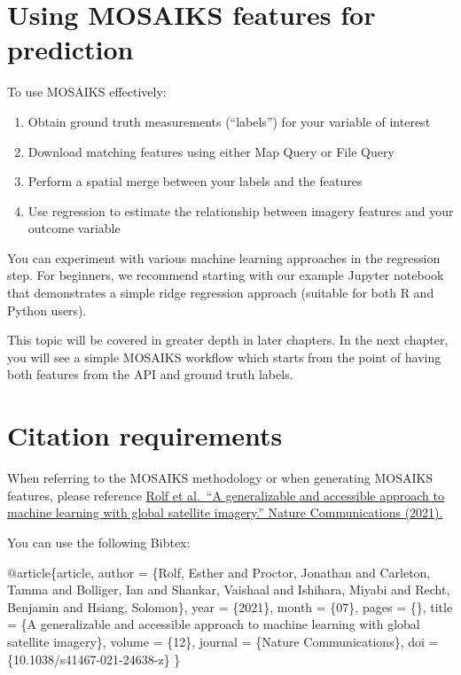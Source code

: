 \documentclass[
  letterpaper,
  DIV=11,
  numbers=noendperiod]{scrreprt}
\newenvironment{Shaded}{\begin{snugshade}}{\end{snugshade}}
\newcommand{\DataTypeTok}[1]{\textcolor[rgb]{0.68,0.00,0.00}{#1}}
\newcommand{\NormalTok}[1]{\textcolor[rgb]{0.00,0.23,0.31}{#1}}
\newcommand{\OtherTok}[1]{\textcolor[rgb]{0.00,0.23,0.31}{#1}}
\newcommand{\VariableTok}[1]{\textcolor[rgb]{0.07,0.07,0.07}{#1}}
\providecommand{\tightlist}{%
  \setlength{\itemsep}{0pt}\setlength{\parskip}{0pt}}\usepackage{longtable,booktabs,array}
\begin{document}
\hypertarget{using-mosaiks-features-for-prediction}{%
\section{Using MOSAIKS features for
prediction}\label{using-mosaiks-features-for-prediction}}

To use MOSAIKS effectively:

\begin{enumerate}
\def\labelenumi{\arabic{enumi}.}
\tightlist
\item
  Obtain ground truth measurements (``labels'') for your variable of
  interest
\item
  Download matching features using either Map Query or File Query
\item
  Perform a spatial merge between your labels and the features
\item
  Use regression to estimate the relationship between imagery features
  and your outcome variable
\end{enumerate}

You can experiment with various machine learning approaches in the
regression step. For beginners, we recommend starting with our example
Jupyter notebook that demonstrates a simple ridge regression approach
(suitable for both R and Python users).

This topic will be covered in greater depth in later chapters. In the
next chapter, you will see a simple MOSAIKS workflow which starts from
the point of having both features from the API and ground truth labels.

\hypertarget{citation-requirements}{%
\section{Citation requirements}\label{citation-requirements}}

When referring to the MOSAIKS methodology or when generating MOSAIKS
features, please reference
\href{https://www.nature.com/articles/s41467-021-24638-z}{Rolf et
al.~``A generalizable and accessible approach to machine learning with
global satellite imagery.'' Nature Communications (2021).}

You can use the following Bibtex:

\begin{Shaded}
\begin{Highlighting}[]
\VariableTok{@article}\NormalTok{\{}\OtherTok{article}\NormalTok{,}
    \DataTypeTok{author}\NormalTok{ = \{Rolf, Esther and Proctor, Jonathan and Carleton, Tamma and Bolliger, Ian and Shankar, Vaishaal and Ishihara, Miyabi and Recht, Benjamin and Hsiang, Solomon\},}
    \DataTypeTok{year}\NormalTok{ = \{2021\},}
    \DataTypeTok{month}\NormalTok{ = \{07\},}
    \DataTypeTok{pages}\NormalTok{ = \{\},}
    \DataTypeTok{title}\NormalTok{ = \{A generalizable and accessible approach to machine learning with global satellite imagery\},}
    \DataTypeTok{volume}\NormalTok{ = \{12\},}
    \DataTypeTok{journal}\NormalTok{ = \{Nature Communications\},}
    \DataTypeTok{doi}\NormalTok{ = \{10.1038/s41467{-}021{-}24638{-}z\}}
\NormalTok{\}}
\end{Highlighting}
\end{Shaded}
\end{document}
